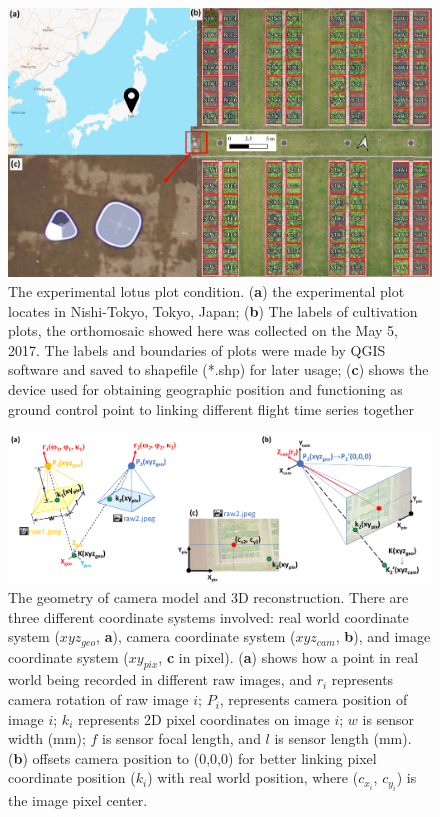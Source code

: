 \documentclass[doublespacing]{configs/bmcart}
\begin{document}
\begin{backmatter}
\begin{figure}[!htb]
  \includegraphics[width=0.95\linewidth]{figures/map.pdf}
  \caption{The experimental lotus plot condition. (\textbf{a}) the experimental plot locates in Nishi-Tokyo, Tokyo, Japan; (\textbf{b}) The labels of cultivation plots, the orthomosaic showed here was collected on the May 5, 2017. The labels and boundaries of plots were made by QGIS software and saved to shapefile (*.shp) for later usage; (\textbf{c}) shows the device used for obtaining geographic position and functioning as ground control point to linking different flight time series together}
  \label{fig:map}
\end{figure}

\begin{figure}[!htb]
  \includegraphics[width=0.95\linewidth]{figures/raw2raw.pdf}
  \caption{The geometry of camera model and 3D reconstruction. There are three different coordinate systems involved: real world coordinate system ($xyz_{geo}$, \textbf{a}), camera coordinate system ($xyz_{cam}$, \textbf{b}), and image coordinate system ($xy_{pix}$, \textbf{c} in pixel). (\textbf{a}) shows how a point in real world being recorded in different raw images, and $r_i$ represents camera rotation of raw image $i$; $P_i$, represents camera position of image $i$; $k_i$ represents 2D pixel coordinates on image $i$; $w$ is sensor width (mm); $f$ is sensor focal length, and $l$ is sensor length (mm). (\textbf{b}) offsets camera position to (0,0,0) for better linking pixel coordinate position ($k_i$) with real world position, where ($c_{x_i}$, $c_{y_i}$) is the image pixel center.}
  \label{fig:geom}
\end{figure}


\end{backmatter}
\end{document}
